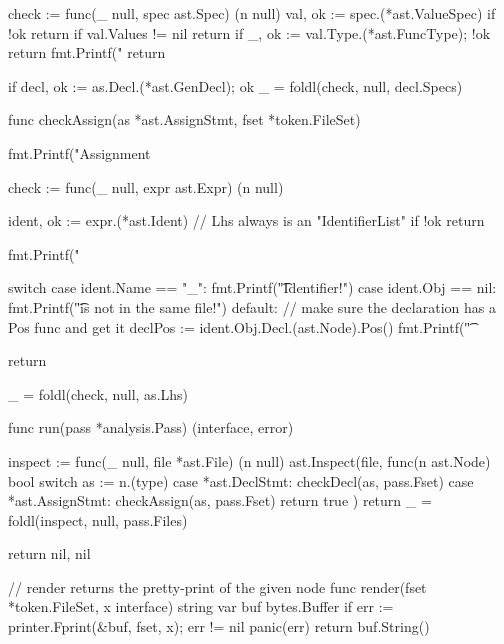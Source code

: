 \documentclass[%
  a4paper,
  twoside,
  numbers=noenddot,
  parskip=half+,
  open=any,
  headsepline,
  english, %
  ba  %
]{zhawthesis}
\newenvironment{code}{\captionsetup{type=listing}}{}
\begin{document}
\begin{appendices}
\begin{code}
\begin{gocode}
{	check := func(_ null, spec ast.Spec) (n null) {
		val, ok := spec.(*ast.ValueSpec)
		if !ok {
			return
		}
		if val.Values != nil {
			return
		}
		if _, ok := val.Type.(*ast.FuncType); !ok {
			return
		}
		fmt.Printf("\tIdent %
		return
	}

	if decl, ok := as.Decl.(*ast.GenDecl); ok {
		_ = foldl(check, null{}, decl.Specs)
	}
}

func checkAssign(as *ast.AssignStmt, fset *token.FileSet) {
	fmt.Printf("Assignment %

	check := func(_ null, expr ast.Expr) (n null) {
		ident, ok := expr.(*ast.Ident) // Lhs always is an "IdentifierList"
		if !ok {
			return
		}

		fmt.Printf("\tIdent %

		switch {
		case ident.Name == "_":
			fmt.Printf("\t\tBlank Identifier!\n")
		case ident.Obj == nil:
			fmt.Printf("\t\tDecl is not in the same file!\n")
		default:
			// make sure the declaration has a Pos func and get it
			declPos := ident.Obj.Decl.(ast.Node).Pos()
			fmt.Printf("\t\tDecl %
		}

		return
	}
	_ = foldl(check, null{}, as.Lhs)
}

func run(pass *analysis.Pass) (interface{}, error) {
	inspect := func(_ null, file *ast.File) (n null) {
		ast.Inspect(file, func(n ast.Node) bool {
			switch as := n.(type) {
			case *ast.DeclStmt:
				checkDecl(as, pass.Fset)
			case *ast.AssignStmt:
				checkAssign(as, pass.Fset)
			}
			return true
		})
		return
	}
	_ = foldl(inspect, null{}, pass.Files)

	return nil, nil
}

// render returns the pretty-print of the given node
func render(fset *token.FileSet, x interface{}) string {
	var buf bytes.Buffer
	if err := printer.Fprint(&buf, fset, x); err != nil {
		panic(err)
	}
	return buf.String()
}
	\end{gocode}
\end{code}


\end{appendices}
\end{document}
